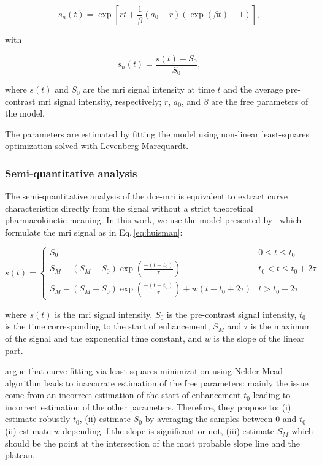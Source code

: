 \begin{equation}
  s_n(t) = \exp\left[rt + \frac{1}{\beta} \left( a_0 - r \right) \left( \exp(\beta t) - 1 \right) \right],
  \label{eq:pun}
\end{equation}

\noindent with

\begin{equation}
  s_n(t) = \frac{s(t) - S_0}{S_0},
  \label{eq:enh}
\end{equation}

\noindent where $s(t)$ and $S_0$ are the \ac{mri} signal intensity at time $t$ and the average pre-contrast \ac{mri} signal intensity, respectively; $r$, $a_0$, and $\beta$ are the free parameters of the model.

The parameters are estimated by fitting the model using non-linear least-squares optimization solved with Levenberg-Marcquardt.

\subsubsection{Semi-quantitative analysis}\label{sec:semi}

The semi-quantitative analysis of the \ac{dce}-\ac{mri} is equivalent to extract curve characteristics directly from the signal without a strict theoretical pharmacokinetic meaning.
In this work, we use the model presented by~\cite{huisman2001accurate} which formulate the \ac{mri} signal as in Eq.\,\eqref{eq:huisman}:

\begin{equation}
  s(t) = \begin{cases}
    S_0 & 0 \leq t \leq t_0 \\
    S_M - (S_M - S_0) \exp\left( \frac{-(t - t_0)}{\tau} \right) & t_0 < t \leq t_0 + 2 \tau \\
    S_M - (S_M - S_0) \exp\left( \frac{-(t - t_0)}{\tau} \right) + w(t - t_0 + 2 \tau) & t > t_0 + 2 \tau
  \end{cases}
  \label{eq:huisman}
\end{equation}

\noindent where $s(t)$ is the \ac{mri} signal intensity, $S_0$ is the pre-contrast signal intensity, $t_0$ is the time corresponding to the start of enhancement, $S_M$ and $\tau$ is the maximum of the signal and the exponential time constant, and $w$ is the slope of the linear part.

\citeauthor{huisman2001accurate} argue that curve fitting via least-squares minimization using Nelder-Mead algorithm leads to inaccurate estimation of the free parameters: mainly the issue come from an incorrect estimation of the start of enhancement $t_0$ leading to incorrect estimation of the other parameters.
Therefore, they propose to:
(i) estimate robustly $t_0$,
(ii) estimate $S_0$ by averaging the samples between $0$ and $t_0$
(ii) estimate $w$ depending if the slope is significant or not,
(iii) estimate $S_M$ which should be the point at the intersection of the most probable slope line and the plateau.

